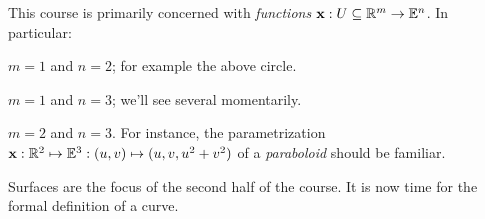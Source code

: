 
This course is primarily concerned with \emph{functions} ${\mathbf{x}}:U\subseteq\mathbb{R}^m\to\mathbb{E}^n$. In particular:
\begin{description}\itemsep0pt
	\item[\normalfont\emph{Plane curves}:] $m=1$ and $n=2$; for example the above circle.
	\item[\normalfont\emph{Spacecurves}:] $m=1$ and $n=3$; we'll see several momentarily.
	\item[\normalfont\emph{Surfaces}:] $m=2$ and $n=3$. For instance, the parametrization ${\mathbf{x}}:\mathbb{R}^2\mapsto\mathbb{E}^3:(u,v)\mapsto (u,v,u^2+v^2)$ of a \emph{paraboloid} should be  familiar.
\end{description}

Surfaces are the focus of the second half of the course. %
It is now time for the formal definition of a curve.

\goodbreak
 
% 
% 
% 
% 
% 
% 
% 
% 


